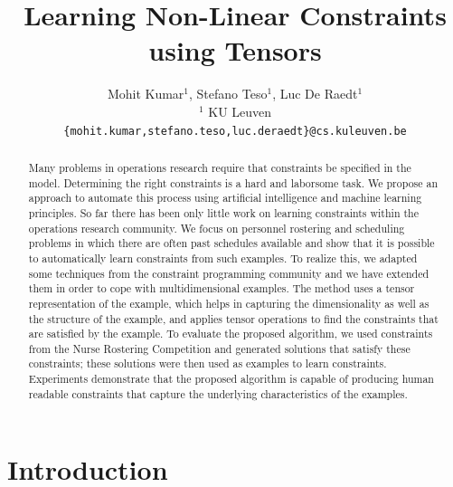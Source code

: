 \documentclass{article}
\title{Learning Non-Linear Constraints using Tensors}
\author{
Mohit Kumar$^1$,
Stefano Teso$^1$,
Luc De Raedt$^1$
\\ 
$^1$ KU Leuven\\
%
\texttt{\{mohit.kumar,stefano.teso,luc.deraedt\}@cs.kuleuven.be}
}
\begin{document}
\maketitle

\begin{abstract}
Many problems in operations research require that constraints be specified in the model. Determining the right constraints is a hard and laborsome task.
We propose an approach to automate this process using artificial intelligence and machine learning principles. So far there has been only little work on learning constraints within the operations research community.
We focus on personnel rostering and scheduling problems in which there are often past schedules available and show that it is possible to automatically learn  constraints from such examples. 
To realize this, we adapted some techniques from the constraint programming community and  we have extended them in order to  cope with multidimensional examples. 
The method uses a tensor representation of the example, which helps in capturing the dimensionality as well as the structure of the example, and applies tensor operations to find the constraints that are satisfied by the example. 
To evaluate the proposed algorithm, we used constraints from the Nurse Rostering Competition and generated solutions that satisfy these constraints; these  solutions were then used as examples to learn constraints. Experiments demonstrate that the proposed algorithm is capable of producing human readable constraints that capture the underlying characteristics of the examples. 
\end{abstract}


\section{Introduction}
\label{sec:intro}

\end{document}
